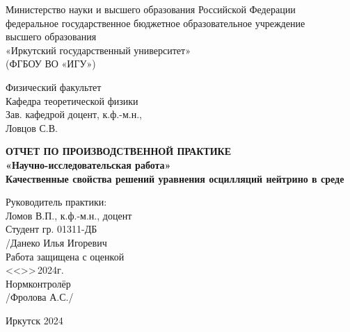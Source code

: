 \documentclass[a4paper,12pt]{article}
\begin{document}
\onehalfspacing
\pagestyle{plain}

\begin{titlepage}
	\begin{center}%
		Министерство науки и высшего образования Российской Федерации\\
		федеральное государственное бюджетное образовательное учреждение\\
		высшего образования \\
		«Иркутский государственный университет»\\
		(ФГБОУ ВО «ИГУ»)\\
	\end{center}
	\vspace*{3em}
	
	\begin{flushright}
		\begin{minipage}{92mm}
			Физический факультет\\
			Кафедра теоретической физики\\
			Зав. кафедрой доцент, к.ф.-м.н.,\\
			Ловцов С.В.\;\underline{\hspace{35mm}}
		\end{minipage}
	\end{flushright}
	\vspace*{4em}
	
	\begin{center}
		\large
		\bfseries%
		ОТЧЕТ ПО ПРОИЗВОДСТВЕННОЙ ПРАКТИКЕ\\
		«Научно-исследовательская работа»\\[2ex]
		
		\Large
		Качественные свойства решений уравнения осцилляций нейтрино в среде
	\end{center}
	
	\vspace*{3em}
	
	\begin{flushright}
		\begin{minipage}{95mm}
			Руководитель практики:
			\underline{\hspace{35mm}}\\
			Ломов В.П., к.ф.-м.н., доцент\\[3ex]
			Студент гр. 01311-ДБ\\
			\underline{\hspace{35mm}}/Данеко Илья Игоревич\\[3ex]
			Работа защищена с оценкой \underline{\hspace{30mm}}\\
			<<\underline{\hspace{8mm}}>>\underline{\hspace{22mm}}\,2024г.\\
			Нормконтролёр\\
			\underline{\hspace{35mm}}/Фролова А.С./\\
		\end{minipage}
	\end{flushright}
	
	\vfill
	\begin{center}
		Иркутск 2024
	\end{center}
\end{titlepage}
\end{document}
